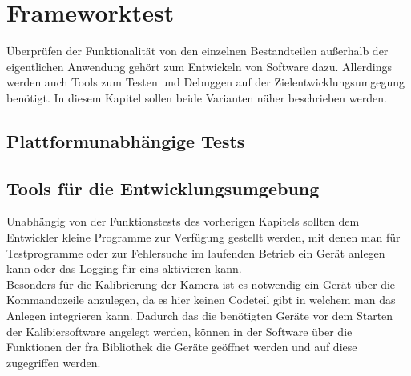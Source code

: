 \chapter{Frameworktest} \label{sec:test}
Überprüfen der Funktionalität von den einzelnen Bestandteilen außerhalb der eigentlichen Anwendung gehört zum Entwickeln von Software dazu. %
Allerdings werden auch Tools zum Testen und Debuggen auf der Zielentwicklungsumgegung benötigt. 
In diesem Kapitel sollen beide Varianten näher beschrieben werden.

\section{Plattformunabhängige Tests}


\section{Tools für die Entwicklungsumgebung}
Unabhängig von der Funktionstests des vorherigen Kapitels sollten dem Entwickler kleine Programme zur Verfügung gestellt werden, mit denen man für Testprogramme oder zur Fehlersuche im laufenden Betrieb ein Gerät anlegen kann oder das Logging für eins aktivieren kann.\\


Besonders für die Kalibrierung der Kamera ist es notwendig ein Gerät über die Kommandozeile anzulegen, da es hier keinen Codeteil gibt in welchem man das Anlegen integrieren kann. Dadurch das die benötigten Geräte vor dem Starten der Kalibiersoftware angelegt werden, können in der Software über die Funktionen der \ac{fra} Bibliothek die Geräte geöffnet werden und auf diese zugegriffen werden.


